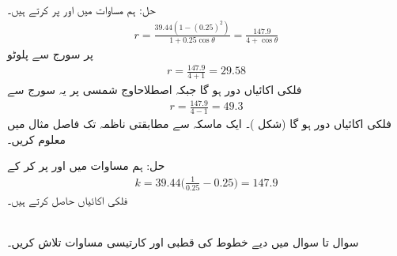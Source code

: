 حل:\quad
ہم  مساوات  میں  اور  پر کرتے ہیں۔
\begin{align*}
r=\frac{39.44(1-(0.25)^2)}{1+0.25\cos\theta}=\frac{147.9}{4+\cos\theta}
\end{align*}
 پر سورج سے پلوٹو
\begin{align*}
r=\frac{147.9}{4+1}=29.58
\end{align*}
فلکی اکائیاں دور ہو گا جبکہ اصطلاح{اوج شمسی} پر یہ سورج سے
\begin{align*}
r=\frac{147.9}{4-1}=49.3
\end{align*}
فلکی اکائیاں دور ہو گا (شکل )۔
ایک ماسکہ سے مطابقتی ناظمہ تک فاصل مثال  میں معلوم کریں۔

حل:\quad
ہم مساوات  میں  اور  پر کر کے
\begin{align*}
k=39.44\big(\frac{1}{0.25}-0.25\big)=147.9
\end{align*}
فلکی اکائیاں حاصل کرتے ہیں۔

\\
سوال   تا سوال  میں دیے خطوط کی قطبی اور کارتیسی مساوات تلاش کریں۔ 

